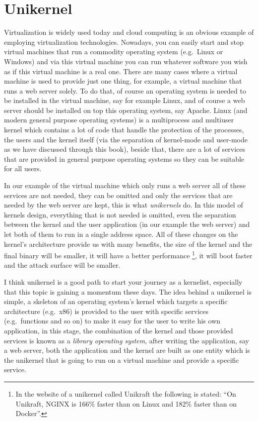 \section{Unikernel}\label{unikernel}

Virtualization is widely used today and cloud computing is an obvious
example of employing virtualization technologies. Nowadays, you can
easily start and stop virtual machines that run a commodity operating
system (e.g.~Linux or Windows) and via this virtual machine you can run
whatever software you wish as if this virtual machine is a real one.
There are many cases where a virtual machine is used to provide just one
thing, for example, a virtual machine that runs a web server solely. To
do that, of course an operating system is needed to be installed in the
virtual machine, say for example Linux, and of course a web server
should be installed on top this operating system, say Apache. Linux (and
modern general purpose operating systems) is a multiprocess and
multiuser kernel which contains a lot of code that handle the protection
of the processes, the users and the kernel itself (via the separation of
kernel-mode and user-mode as we have discussed through this book),
beside that, there are a lot of services that are provided in general
purpose operating systems so they can be suitable for all users.

In our example of the virtual machine which only runs a web server all
of these services are not needed, they can be omitted and only the
services that are needed by the web server are kept, this is what
\emph{unikernels} do. In this model of kernels design, everything that
is not needed is omitted, even the separation between the kernel and the
user application (in our example the web server) and let both of them to
run in a single address space. All of these changes on the kernel's
architecture provide us with many benefits, the size of the kernel and
the final binary will be smaller, it will have a better performance
\footnote{In the website of a unikernel called Unikraft the following is
  stated: ``On Unikraft, NGINX is 166\% faster than on Linux and 182\%
  faster than on Docker''.}, it will boot faster and the attack surface
will be smaller.

I think unikernel is a good path to start your journey as a kernelist,
especially that this topic is gaining a momentum these days. The idea
behind a unikernel is simple, a skeleton of an operating system's kernel
which targets a specific architecture (e.g.~x86) is provided to the user
with specific services (e.g.~functions and so on) to make it easy for
the user to write his own application, in this stage, the combination of
the kernel and those provided services is known as a \emph{library
operating system}, after writing the application, say a web server, both
the application and the kernel are built as one entity which is the
unikernel that is going to run on a virtual machine and provide a
specific service.

